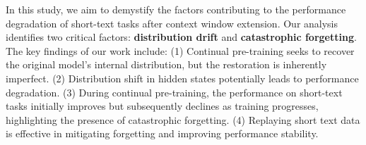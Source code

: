 



In this study, we aim to demystify the factors contributing to the performance degradation of short-text tasks after context window extension. Our analysis identifies two critical factors: \textbf{distribution drift} and \textbf{catastrophic forgetting}. The key findings of our work include: (1) Continual pre-training seeks to recover the original model's internal distribution, but the restoration is inherently imperfect. (2) Distribution shift in hidden states potentially leads to performance degradation. (3) During continual pre-training, the performance on short-text tasks initially improves but subsequently declines as training progresses, highlighting the presence of catastrophic forgetting. (4) Replaying short text data
is effective in mitigating forgetting and improving performance stability.



